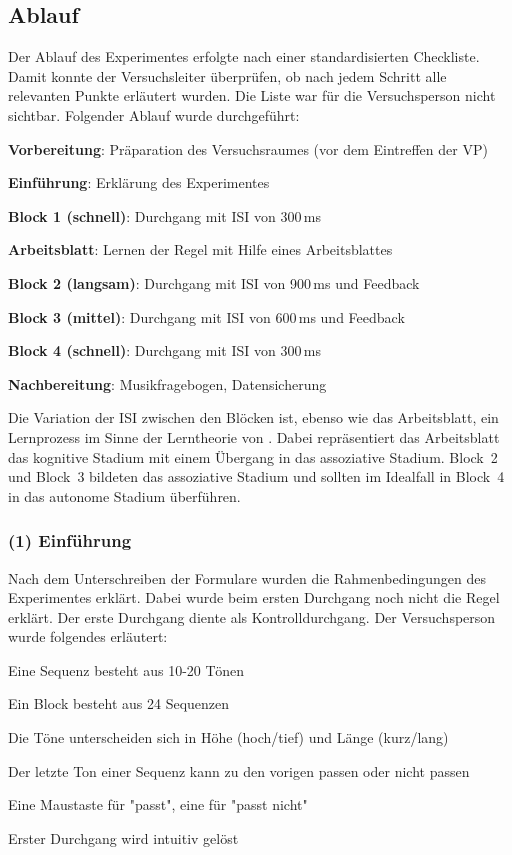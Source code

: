 \documentclass[doc,a4paper,12pt]{apa6}
\begin{document}
\subsection{Ablauf}

Der Ablauf des Experimentes erfolgte nach einer standardisierten Checkliste. Damit konnte der Versuchsleiter überprüfen, ob nach jedem Schritt alle relevanten Punkte erläutert wurden. Die Liste war für die Versuchsperson nicht sichtbar. Folgender Ablauf wurde durchgeführt:

\begin{compactenum}
  \setcounter{enumi}{-1}
  \item \textbf{Vorbereitung}: Präparation des Versuchsraumes (vor dem Eintreffen der VP)
  \item \textbf{Einführung}: Erklärung des Experimentes
  \item \textbf{Block 1 (schnell)}: Durchgang mit ISI von 300\,ms
  \item \textbf{Arbeitsblatt}: Lernen der Regel mit Hilfe eines Arbeitsblattes
  \item \textbf{Block 2 (langsam)}: Durchgang mit ISI von 900\,ms und Feedback
  \item \textbf{Block 3 (mittel)}: Durchgang mit ISI von 600\,ms und Feedback
  \item \textbf{Block 4 (schnell)}: Durchgang mit ISI von 300\,ms
  \item \textbf{Nachbereitung}: Musikfragebogen, Datensicherung
\end{compactenum}

Die Variation der ISI zwischen den Blöcken ist, ebenso wie das Arbeitsblatt, ein Lernprozess im Sinne der Lerntheorie von \textcite{fitts1967human}. Dabei repräsentiert das Arbeitsblatt das kognitive Stadium mit einem Übergang in das assoziative Stadium. Block~2 und Block~3 bildeten das assoziative Stadium und sollten im Idealfall in Block~4 in das autonome Stadium überführen.

\subsubsection{(1) Einführung}

Nach dem Unterschreiben der Formulare wurden die Rahmenbedingungen des Experimentes erklärt. Dabei wurde beim ersten Durchgang noch nicht die Regel erklärt. Der erste Durchgang diente als Kontrolldurchgang. Der Versuchsperson wurde folgendes erläutert:

\begin{compactitem}
\item Eine Sequenz besteht aus 10-20 Tönen
\item Ein Block besteht aus 24 Sequenzen
\item Die Töne unterscheiden sich in Höhe (hoch/tief) und Länge (kurz/lang)
\item Der letzte Ton einer Sequenz kann zu den vorigen passen oder nicht passen
\item Eine Maustaste für "passt", eine für "passt nicht"
\item Erster Durchgang wird intuitiv gelöst
\end{compactitem}
\end{document}
